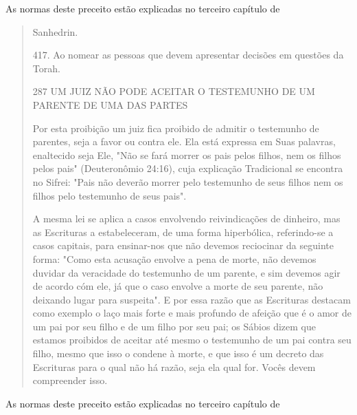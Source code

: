 As normas deste preceito estão explicadas no terceiro capítulo de

\begin{quote}
Sanhedrin.

417. Ao nomear as pessoas que devem apresentar decisões em questões da
Torah.

287 UM JUIZ NÃO PODE ACEITAR O TESTEMUNHO DE UM PARENTE DE UMA DAS
PARTES

Por esta proibição um juiz fica proibido de admitir o testemunho de
parentes, seja a favor ou contra ele. Ela está expressa em Suas
palavras, enal­tecido seja Ele, "Não se fará morrer os pais pelos
filhos, nem os filhos pelos pais" (Deuteronômio 24:16), cuja explicação
Tradicional se encontra no Sifrei: "Pais não deverão morrer pelo
testemunho de seus filhos nem os filhos pelo testemunho de seus pais".

A mesma lei se aplica a casos envolvendo reivindicações de dinhei­ro,
mas as Escrituras a estabeleceram, de uma forma hiperbólica,
referindo-se a casos capitais, para ensinar-nos que não devemos
reciocinar da seguinte for­ma: "Como esta acusação envolve a pena de
morte, não devemos duvidar da veracidade do testemunho de um parente, e
sim devemos agir de acordo cóm ele, já que o caso envolve a morte de seu
parente, não deixando lugar para sus­peita". E por essa razão que as
Escrituras destacam como exemplo o laço mais forte e mais profundo de
afeição que é o amor de um pai por seu filho e de um filho por seu pai;
os Sábios dizem que estamos proibidos de aceitar até mes­mo o testemunho
de um pai contra seu filho, mesmo que isso o condene à morte, e que isso
é um decreto das Escrituras para o qual não há razão, seja ela qual for.
Vocês devem compreender isso.
\end{quote}

As normas deste preceito estão explicadas no terceiro capítulo de

